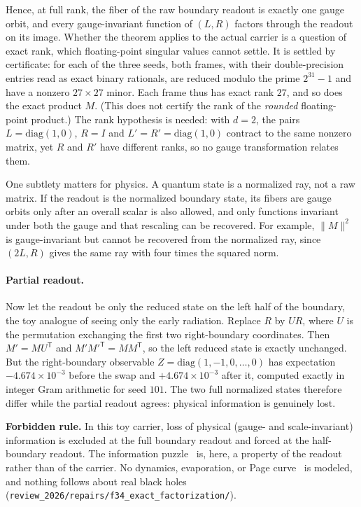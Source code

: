 \documentclass[11pt]{article}
\theoremstyle{definition}
\begin{document}
Hence, at full rank, the fiber of the raw boundary readout is exactly one gauge orbit, and every gauge-invariant
function of \((L,R)\) factors through the readout on its image. Whether the theorem applies to the actual carrier is a
question of exact rank, which floating-point singular values cannot settle. It is settled by certificate: for each of
the three seeds, both frames, with their double-precision entries read as exact binary rationals, are reduced modulo the prime
\(2^{31}-1\) and have a nonzero \(27\times27\) minor. Each frame thus has exact rank \(27\), and so does the exact product
\(M\). (This does not certify the rank of the \emph{rounded} floating-point product.) The rank hypothesis is needed:
with \(d=2\), the pairs \(L=\mathrm{diag}(1,0)\), \(R=I\) and \(L'=R'=\mathrm{diag}(1,0)\) contract to the same
nonzero matrix, yet \(R\) and \(R'\) have different ranks, so no gauge transformation relates them.

One subtlety matters for physics. A quantum state is a normalized ray, not a raw matrix. If the readout is the
normalized boundary state, its fibers are gauge orbits only after an overall scalar is also allowed, and only
functions invariant under both the gauge and that rescaling can be recovered. For example, \(\|M\|^2\) is
gauge-invariant but cannot be recovered from the normalized ray, since \((2L,R)\) gives the same ray with four times
the squared norm.

\paragraph{Partial readout.} Now let the readout be only the reduced state on the left half of the boundary, the toy
analogue of seeing only the early radiation. Replace \(R\) by \(UR\), where \(U\) is the permutation exchanging the
first two right-boundary coordinates. Then \(M'=MU^{\mathsf T}\) and \(M'M'^{\mathsf T}=MM^{\mathsf T}\), so the left
reduced state is exactly unchanged. But the right-boundary observable \(Z=\mathrm{diag}(1,-1,0,\dots,0)\) has
expectation \(-4.674\times10^{-3}\) before the swap and \(+4.674\times10^{-3}\) after it, computed exactly in integer
Gram arithmetic for seed \(101\). The two full normalized states therefore differ while the partial readout agrees:
physical information is genuinely lost.

\textbf{Forbidden rule.} In this toy carrier, loss of physical (gauge- and scale-invariant) information is excluded at
the full boundary readout and forced at the half-boundary readout. The information puzzle~\citep{Hawking1976} is, here,
a property of the readout rather than of the carrier. No dynamics, evaporation, or Page curve~\citep{Page1993} is
modeled, and nothing follows about real black holes (\nolinkurl{review_2026/repairs/f34_exact_factorization/}).
\end{document}

